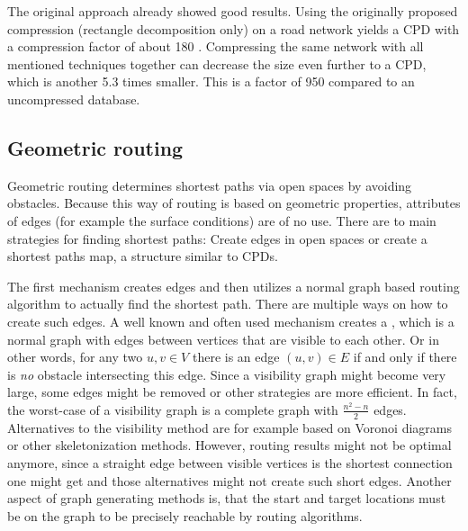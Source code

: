 			The original approach already showed good results.
			Using the originally proposed compression (rectangle decomposition only) on a road network yields a CPD with a compression factor of about 180 \cite[4]{botea-cpd-2013}.
			Compressing the same network with all mentioned techniques together can decrease the size even further to a CPD, which is another 5.3 times smaller.
			This is a factor of 950 compared to an uncompressed database.
	
	\subsection{Geometric routing}
	\label{subsec:geometric-routing}
	
		Geometric routing determines shortest paths via open spaces by avoiding obstacles.
		Because this way of routing is based on geometric properties, attributes of edges (for example the surface conditions) are of no use.
		There are to main strategies for finding shortest paths:
		Create edges in open spaces or create a shortest paths map, a structure similar to CPDs.
		
		The first mechanism creates edges and then utilizes a normal graph based routing algorithm to actually find the shortest path.
		There are multiple ways on how to create such edges.
		A well known and often used mechanism creates a , which is a normal graph with edges between vertices that are visible to each other.
		Or in other words, for any two $u, v \in V$ there is an edge $(u, v) \in E$ if and only if there is \textit{no} obstacle intersecting this edge.
		Since a visibility graph might become very large, some edges might be removed or other strategies are more efficient.
		In fact, the worst-case of a visibility graph is a complete graph with $\frac{n^2 - n}{2}$ edges.
		Alternatives to the visibility method are for example based on Voronoi diagrams or other skeletonization methods\cite[3-4]{graser-osm-open-spaces}.
		However, routing results might not be optimal anymore, since a straight edge between visible vertices is the shortest connection one might get and those alternatives might not create such short edges\cite[7]{graser-osm-open-spaces}.
		Another aspect of graph generating methods is, that the start and target locations must be on the graph to be precisely reachable by routing algorithms.
		
